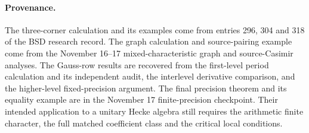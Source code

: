 \documentclass[11pt]{article}
\begin{document}
\paragraph{Provenance.} The three-corner calculation and its examples
come from entries 296, 304 and 318 of the BSD research record. The graph
calculation and source-pairing example come from the November 16--17
mixed-characteristic graph and source-Casimir analyses. The Gauss-row results are recovered from the first-level period calculation and its independent audit, the interlevel derivative comparison, and the higher-level fixed-precision argument. The final
precision theorem and its equality example are in the November 17
finite-precision checkpoint. Their intended application to a unitary
Hecke algebra still requires the arithmetic finite character, the full
matched coefficient class and the critical local conditions.
\end{document}
